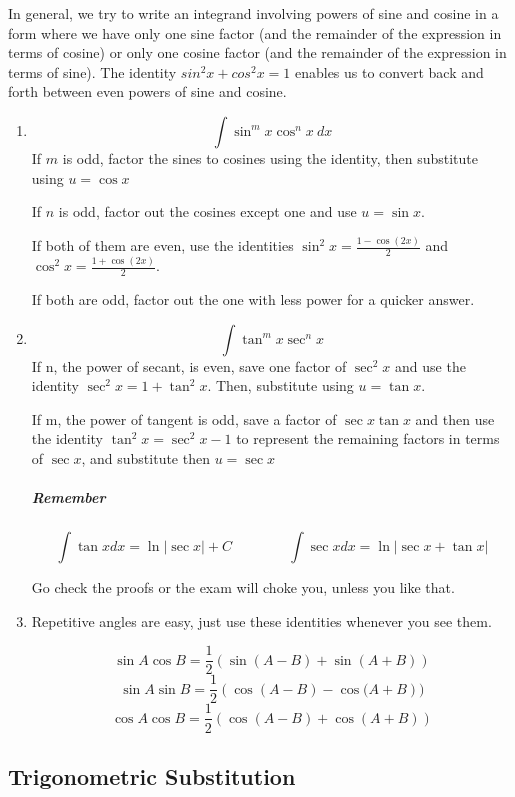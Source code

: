 \documentclass{article}
\begin{document}
	In general, we try to write an integrand involving powers of sine and cosine in a form
	where we have only one sine factor (and the remainder of the expression in terms of	cosine) or only one cosine factor (and the remainder of the expression in terms of sine).
	The identity $sin^2x+ cos^2x = 1$ enables us to convert back and forth between even powers of sine and cosine.
	\begin{enumerate}[1.]
		\item \[ \int \sin^m{ x } \cos^n{ x } \ dx 
			\]
			If $ m $ is odd, factor the sines to cosines using the identity, then substitute using $ u= \cos{ x }  $

			If $ n $ is odd, factor out the cosines except one and use $ u= \sin{ x }  $. 

			If both of them are even, use the identities $ \sin^2{x} = \frac{ 1- \cos{ (2x) }  }{ 2 }  $ and $ \cos^2x = \frac{ 1+ \cos(2x) }{ 2 }  $.

			If both are odd, factor out the one with less power for a quicker answer.

		\item \[
				\int \tan^mx \sec^nx 
			\]
			If n, the power of secant, is even, save one factor of $ \sec^2x $ and use the identity $ \sec^2x=1+\tan^2x $. Then, substitute using $ u = \tan{ x }  $. 

			If m, the power of tangent is odd, save a factor of $ \sec x \tan{ x } $ and then use the identity $ \tan^2{ x } = \sec^2x-1  $ to represent the remaining factors in terms of $ \sec x $, and substitute then $ u = \sec x $ 

			\subparagraph{Remember}
			\[ \int \tan{ x } dx = \ln{|\sec x|} + C \qquad \qquad \int \sec x dx = \ln {|\sec x + \tan{ x } |} \]

		Go check the proofs or the exam will choke you, unless you like that.

		\item Repetitive angles are easy, just use these identities whenever you see them.

			\[
				\sin{ A } \cos{ B } = \frac{1}{2} ( \sin{( A-B )} + \sin{( A+B )}   ) 
			\]
			\[
				\sin{ A } \sin{ B } = \frac{1}{2} ( \cos{( A-B )} - \cos{( A+B }   ))
			\]
			\[
				\cos{ A } \cos{ B } = \frac{1}{2} ( \cos{ (A-B) } + \cos{ (A+B) }   )
			\]

	\end{enumerate}

	\newpage
	\subsection{Trigonometric Substitution}
\end{document}
